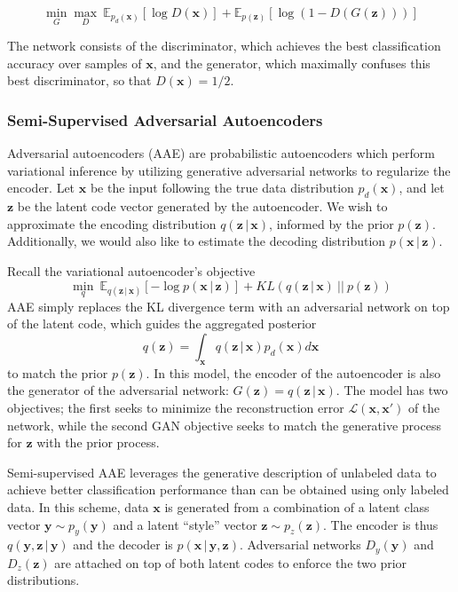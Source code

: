 \documentclass{article}
\newcommand{\vect}[1]{\boldsymbol{#1}}
\newcommand{\E}{\mathbb{E}}
\newcommand{\given}{\,\vert\,}
\begin{document}
\begin{equation}
\min_G \max_D \ \E_{p_d(\vect{x})} [\log D(\vect{x})] + \E_{p(\vect{z})} [\log (1 - D(G(\vect{z})))]
\end{equation}

The network consists of the discriminator, which achieves the best classification accuracy over samples of $\vect{x}$, and the generator, which maximally confuses this best discriminator, so that $D(\vect{x}) = 1/2$.

\subsubsection{Semi-Supervised Adversarial Autoencoders} \label{sssec:aae}

Adversarial autoencoders (AAE) \cite{aae} are probabilistic autoencoders which perform variational inference by utilizing generative adversarial networks to regularize the encoder. Let $\vect{x}$ be the input following the true data distribution $p_d(\vect{x})$, and let $\vect{z}$ be the latent code vector generated by the autoencoder. We wish to approximate the encoding distribution $q(\vect{z}\given\vect{x})$, informed by the prior $p(\vect{z})$. Additionally, we would also like to estimate the decoding distribution $p(\vect{x}\given\vect{z})$. 

Recall the variational autoencoder's objective \cite{vae}
\begin{equation}
\min_q \
\E_{q(\vect{z}\given\vect{x})} [-\log p(\vect{x}\given\vect{z})] + KL(q(\vect{z}\given\vect{x}) \ \vert\vert \ p(\vect{z}))
\end{equation}
AAE simply replaces the KL divergence term with an adversarial network on top of the latent code, which guides the aggregated posterior
\begin{equation}
q(\vect{z}) = \int_{\vect{x}} q(\vect{z}\given\vect{x}) p_d(\vect{x}) d\vect{x}
\end{equation}
to match the prior $p(\vect{z})$. In this model, the encoder of the autoencoder is also the generator of the adversarial network: $G(\vect{z}) = q(\vect{z}\given\vect{x})$. The model has two objectives; the first seeks to minimize the reconstruction error $\mathcal{L}(\vect{x}, \vect{x}')$ of the network, while the second GAN objective seeks to match the generative process for $\vect{z}$ with the prior process. 

Semi-supervised AAE leverages the generative description of unlabeled data to achieve better classification performance than can be obtained using only labeled data. In this scheme, data $\vect{x}$ is generated from a combination of a latent class vector $\vect{y} \sim p_y(\vect{y})$ and a latent ``style'' vector $\vect{z} \sim p_z(\vect{z})$. The encoder is thus $q(\vect{y}, \vect{z} \given \vect{y})$ and the decoder is $p(\vect{x} \given \vect{y}, \vect{z})$. Adversarial networks $D_y(\vect{y})$ and $D_z(\vect{z})$ are attached on top of both latent codes to enforce the two prior distributions.
\end{document}
